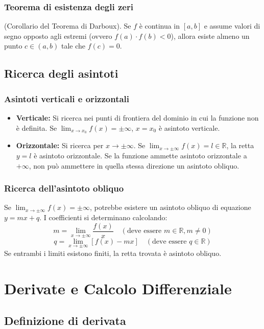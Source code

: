 \subsubsection{Teorema di esistenza degli zeri}
(Corollario del Teorema di Darboux). Se $f$ è continua in $[a, b]$ e assume valori di segno opposto agli estremi (ovvero $f(a) \cdot f(b) < 0$), allora esiste almeno un punto $c \in (a, b)$ tale che $f(c) = 0$.

\subsection{Ricerca degli asintoti}
\subsubsection{Asintoti verticali e orizzontali}
\begin{itemize}
    \item \textbf{Verticale:} Si ricerca nei punti di frontiera del dominio in cui la funzione non è definita. Se $\lim_{x \to x_0} f(x) = \pm\infty$, $x=x_0$ è asintoto verticale.
    \item \textbf{Orizzontale:} Si ricerca per $x \to \pm\infty$. Se $\lim_{x \to \pm\infty} f(x) = l \in \mathbb{R}$, la retta $y=l$ è asintoto orizzontale. Se la funzione ammette asintoto orizzontale a $+\infty$, non può ammettere in quella stessa direzione un asintoto obliquo.
\end{itemize}

\subsubsection{Ricerca dell'asintoto obliquo}
Se $\lim_{x \to \pm\infty} f(x) = \pm\infty$, potrebbe esistere un asintoto obliquo di equazione $y = mx + q$. I coefficienti si determinano calcolando:
\[ m = \lim_{x \to \pm\infty} \frac{f(x)}{x} \quad (\text{deve essere } m \in \mathbb{R}, m \neq 0) \]
\[ q = \lim_{x \to \pm\infty} [f(x) - mx] \quad (\text{deve essere } q \in \mathbb{R}) \]
Se entrambi i limiti esistono finiti, la retta trovata è asintoto obliquo.

\section{Derivate e Calcolo Differenziale}
\subsection{Definizione di derivata}

